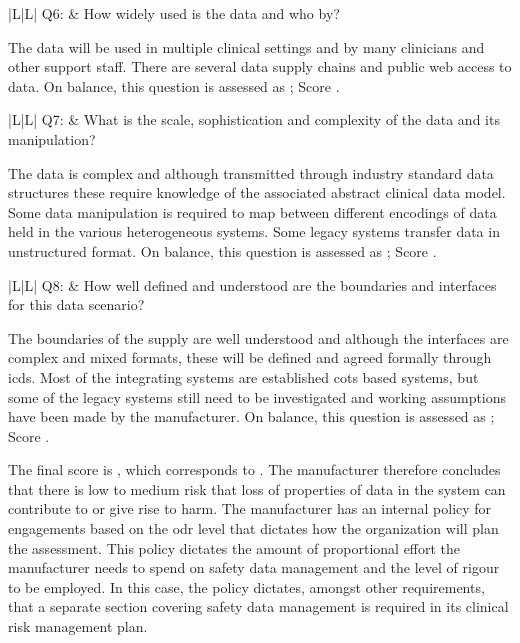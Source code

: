 \addtocounter{table}{-1} %
\begin{longtable*}[H]
	{|L{}|L{}|}
	\hline
	Q6: & How widely used is the data and who by?\\
	\hline
\end{longtable*}

The data will be used in multiple clinical settings and by many clinicians and other support staff. There are several data supply chains and public web access to data. On balance, this question is assessed as ; Score .

\addtocounter{table}{-1} %
\begin{longtable*}[H]
	{|L{}|L{}|}
	\hline
	Q7: & What is the scale, sophistication and complexity of the data and its manipulation?\\
	\hline
\end{longtable*}

The data is complex and although transmitted through industry standard data structures these require knowledge of the associated abstract clinical data model. Some data manipulation is required to map between different encodings of data held in the various heterogeneous systems. Some legacy systems transfer data in unstructured format. On balance, this question is assessed as ; Score .

\addtocounter{table}{-1} %
\begin{longtable*}[H]
	{|L{}|L{}|}
	\hline
	Q8: & How well defined and understood are the boundaries and interfaces for this data scenario?\\
	\hline
\end{longtable*}
The boundaries of the supply are well understood and although the interfaces are complex and mixed formats, these will be defined and agreed formally through \glspl{icd}. Most of the integrating systems are established \gls{cots} based systems, but some of the legacy systems still need to be investigated and working assumptions have been
made by the manufacturer. On balance, this question is assessed as ; Score .

The final score is , which corresponds to . The manufacturer therefore concludes that there is low to medium risk that loss of properties of data in the system can contribute to or give rise to harm. The manufacturer has an internal policy for engagements based on the \gls{odr} level that dictates how the organization will plan the assessment. This policy dictates the amount of proportional effort the manufacturer needs to spend on safety data management and the level of rigour to be employed. In this case, the policy dictates, amongst other requirements, that a separate section covering safety data management is required in its clinical risk management plan.

